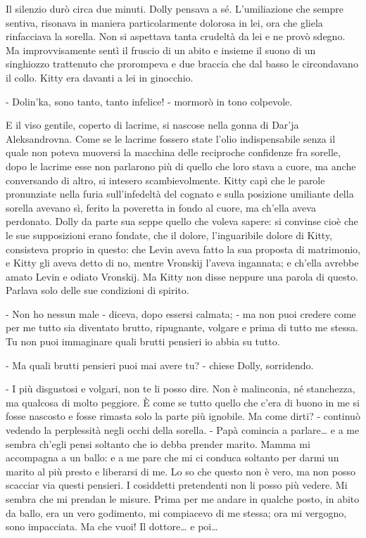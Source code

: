 Il silenzio durò circa due minuti. Dolly pensava a sé. L'umiliazione che sempre sentiva, risonava in maniera particolarmente dolorosa in lei, ora che gliela rinfacciava la sorella. Non si aspettava tanta crudeltà da lei e ne provò sdegno. Ma improvvisamente sentì il fruscio di un abito e insieme il suono di un singhiozzo trattenuto che prorompeva e due braccia che dal basso le circondavano il collo. Kitty era davanti a lei in ginocchio. 

- Dolin'ka, sono tanto, tanto infelice! - mormorò in tono colpevole. 

E il viso gentile, coperto di lacrime, si nascose nella gonna di Dar'ja Aleksandrovna. Come se le lacrime fossero state l'olio indispensabile senza il quale non poteva muoversi la macchina delle reciproche confidenze fra sorelle, dopo le lacrime esse non parlarono più di quello che loro stava a cuore, ma anche conversando di altro, si intesero scambievolmente. Kitty capì che le parole pronunziate nella furia sull'infedeltà del cognato e sulla posizione umiliante della sorella avevano sì, ferito la poveretta in fondo al cuore, ma ch'ella aveva perdonato. Dolly da parte sua seppe quello che voleva sapere: si convinse cioè che le sue supposizioni erano fondate, che il dolore, l'inguaribile dolore di Kitty, consisteva proprio in questo: che Levin aveva fatto la sua proposta di matrimonio, e Kitty gli aveva detto di no, mentre Vronskij l'aveva ingannata; e ch'ella avrebbe amato Levin e odiato Vronskij. Ma Kitty non disse neppure una parola di questo. Parlava solo delle sue condizioni di spirito. 

- Non ho nessun male - diceva, dopo essersi calmata; - ma non puoi credere come per me tutto sia diventato brutto, ripugnante, volgare e prima di tutto me stessa. Tu non puoi immaginare quali brutti pensieri io abbia su tutto. 

- Ma quali brutti pensieri puoi mai avere tu? - chiese Dolly, sorridendo. 

- I più disgustosi e volgari, non te li posso dire. Non è malinconia, né stanchezza, ma qualcosa di molto peggiore. È come se tutto quello che c'era di buono in me si fosse nascosto e fosse rimasta solo la parte più ignobile. Ma come dirti? - continuò vedendo la perplessità negli occhi della sorella. - Papà comincia a parlare\ldots{} e a me sembra ch'egli pensi soltanto che io debba prender marito. Mamma mi accompagna a un ballo: e a me pare che mi ci conduca soltanto per darmi un marito al più presto e liberarsi di me. Lo so che questo non è vero, ma non posso scacciar via questi pensieri. I cosiddetti pretendenti non li posso più vedere. Mi sembra che mi prendan le misure. Prima per me andare in qualche posto, in abito da ballo, era un vero godimento, mi compiacevo di me stessa; ora mi vergogno, sono impacciata. Ma che vuoi! Il dottore\ldots{} e poi\ldots{} 

